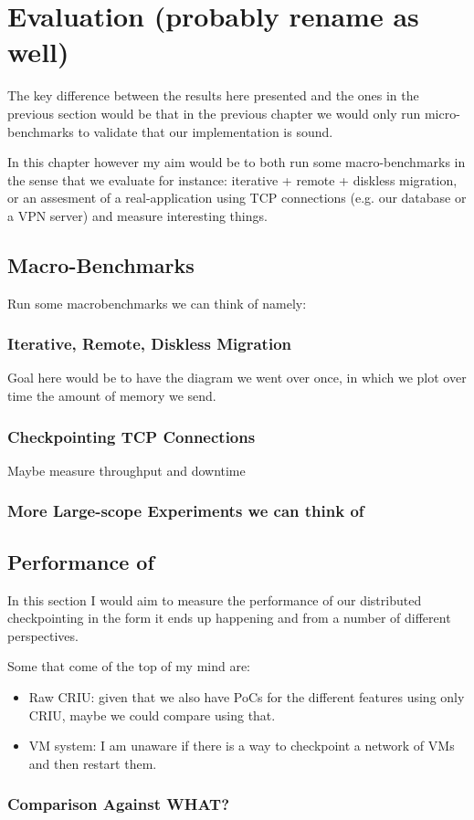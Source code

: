 \chapter{Evaluation (probably rename as well)} \label{chap:evaluation}

The key difference between the results here presented and the ones in the previous section would be that in the previous chapter we would only run micro-benchmarks to validate that our implementation is sound.

In this chapter however my aim would be to both run some macro-benchmarks in the sense that we evaluate for instance: iterative + remote + diskless migration, or an assesment of a real-application using TCP connections (e.g. our database or a VPN server) and measure interesting things.

\section{Macro-Benchmarks}

Run some macrobenchmarks we can think of namely:

\subsection{Iterative, Remote, Diskless Migration}

Goal here would be to have the diagram we went over once, in which we plot over time the amount of memory we send.

\subsection{Checkpointing TCP Connections}

Maybe measure throughput and downtime

\subsection{More Large-scope Experiments we can think of}

\section{Performance of \projName}

In this section I would aim to measure the performance of our distributed checkpointing in the form it ends up happening and from a number of different perspectives.

Some that come of the top of my mind are:
\begin{itemize}
    \item Raw CRIU: given that we also have PoCs for the different features using only CRIU, maybe we could compare using that.
    \item VM system: I am unaware if there is a way to checkpoint a network of VMs and then restart them.
\end{itemize}

\subsection{Comparison Against WHAT?}
